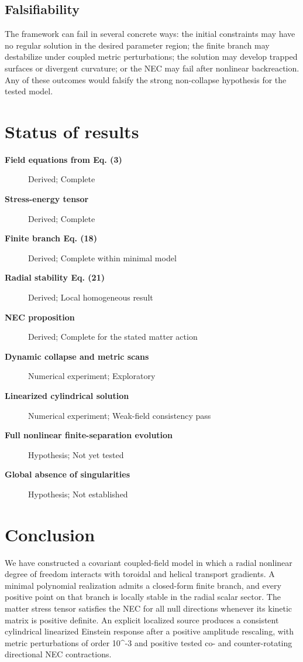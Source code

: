 \documentclass[aps,prd,preprint,nofootinbib,superscriptaddress]{revtex4-2}
\begin{document}
\subsection{Falsifiability}

The framework can fail in several concrete ways: the initial constraints may have no regular solution in the desired parameter region; the finite branch may destabilize under coupled metric perturbations; the solution may develop trapped surfaces or divergent curvature; or the NEC may fail after nonlinear backreaction. Any of these outcomes would falsify the strong non-collapse hypothesis for the tested model.


\section{Status of results}

\begin{description}
\item[\textbf{Field equations from Eq. (3)}] Derived; Complete
\item[\textbf{Stress-energy tensor}] Derived; Complete
\item[\textbf{Finite branch Eq. (18)}] Derived; Complete within minimal model
\item[\textbf{Radial stability Eq. (21)}] Derived; Local homogeneous result
\item[\textbf{NEC proposition}] Derived; Complete for the stated matter action
\item[\textbf{Dynamic collapse and metric scans}] Numerical experiment; Exploratory
\item[\textbf{Linearized cylindrical solution}] Numerical experiment; Weak-field consistency pass
\item[\textbf{Full nonlinear finite-separation evolution}] Hypothesis; Not yet tested
\item[\textbf{Global absence of singularities}] Hypothesis; Not established
\end{description}

\section{Conclusion}

We have constructed a covariant coupled-field model in which a radial nonlinear degree of freedom interacts with toroidal and helical transport gradients. A minimal polynomial realization admits a closed-form finite branch, and every positive point on that branch is locally stable in the radial scalar sector. The matter stress tensor satisfies the NEC for all null directions whenever its kinetic matrix is positive definite. An explicit localized source produces a consistent cylindrical linearized Einstein response after a positive amplitude rescaling, with metric perturbations of order 10\textasciicircum{}-3 and positive tested co- and counter-rotating directional NEC contractions.
\end{document}
